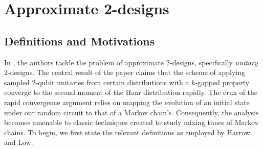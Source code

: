 \documentclass[12pt]{amsart}
\theoremstyle{definition}
\theoremstyle{remark}
\numberwithin{equation}{section}
\theoremstyle{remark}
\begin{document}
\section{Approximate 2-designs}

\subsection{Definitions and Motivations}
In \cite{harrlow}, the authors tackle the problem of approximate $2$-designs, specifically \emph{unitary} $2$-designs. The central result of the paper claims that the scheme of applying sampled $2$-qubit unitaries from certain distributions with a $k$-gapped property converge to the second moment of the Haar distribution rapidly. The crux of the rapid convergence argument relies on mapping the evolution of an initial state under our random circuit to that of a Markov chain's.
Consequently, the analysis becomes amenable to classic techniques created to study mixing times of Markov chains. To begin, we first state the relevant definitions as employed by Harrow and Low.
\end{document}
